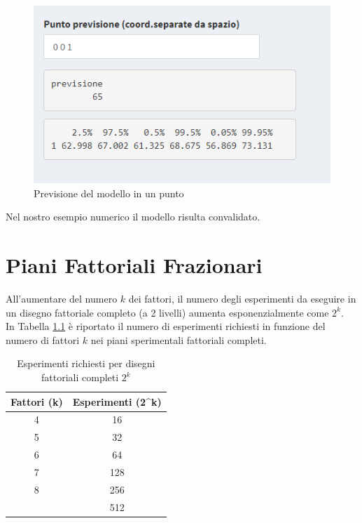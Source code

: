 \documentclass[
  11pt,
]{book}
\begin{document}
\begin{figure}

{\centering \includegraphics[width=1\linewidth]{Immagini/Fatt_compl/13_prev} 

}

\caption{Previsione del modello in un punto}\label{fig:fc13}
\end{figure}

Nel nostro esempio numerico il modello risulta convalidato.

\hypertarget{piani-fattoriali-frazionari}{%
\chapter{Piani Fattoriali Frazionari}\label{piani-fattoriali-frazionari}}

All'aumentare del numero \(k\) dei fattori, il numero degli esperimenti da eseguire in un disegno fattoriale completo (a 2 livelli) aumenta esponenzialmente come \(2^k\).\\
In Tabella \ref{tab:exprich} è riportato il numero di esperimenti richiesti in funzione del numero di fattori \(k\) nei piani sperimentali fattoriali completi.

\begin{table}

\caption{\label{tab:exprich}Esperimenti richiesti per disegni fattoriali completi $2^k$}
\centering
\begin{tabular}[t]{cc}
\toprule
Fattori (k) & Esperimenti (2\textasciicircum{}k)\\
\midrule
4 & 16\\
5 & 32\\
6 & 64\\
7 & 128\\
8 & 256\\
\addlinespace
9 & 512\\
\bottomrule
\end{tabular}
\end{table}
\end{document}

